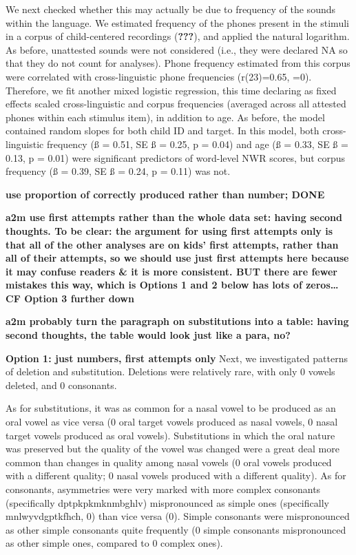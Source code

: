 \documentclass[english,,man,floatsintext]{apa6}
\begin{document}
We next checked whether this may actually be due to frequency of the sounds within the language. We estimated frequency of the phones present in the stimuli in a corpus of child-centered recordings ({\textbf{???}}), and applied the natural logarithm. As before, unattested sounds were not considered (i.e., they were declared NA so that they do not count for analyses). Phone frequency estimated from this corpus were correlated with cross-linguistic phone frequencies (r(23)=0.65, =0). Therefore, we fit another mixed logistic regression, this time declaring as fixed effects scaled cross-linguistic and corpus frequencies (averaged across all attested phones within each stimulus item), in addition to age. As before, the model contained random slopes for both child ID and target. In this model, both cross-linguistic frequency (ß = 0.51, SE ß = 0.25, p = 0.04) and age (ß = 0.33, SE ß = 0.13, p = 0.01) were significant predictors of word-level NWR scores, but corpus frequency (ß = 0.39, SE ß = 0.24, p = 0.11) was not.

\textbf{use proportion of correctly produced rather than number; DONE}

\textbf{a2m use first attempts rather than the whole data set: having second thoughts. To be clear: the argument for using first attempts only is that all of the other analyses are on kids' first attempts, rather than all of their attempts, so we should use just first attempts here because it may confuse readers \& it is more consistent. BUT there are fewer mistakes this way, which is Options 1 and 2 below has lots of zeros\ldots{} CF Option 3 further down}

\textbf{a2m probably turn the paragraph on substitutions into a table: having second thoughts, the table would look just like a para, no?}

\textbf{Option 1: just numbers, first attempts only }
Next, we investigated patterns of deletion and substitution. Deletions were relatively rare, with only 0 vowels deleted, and 0 consonants.

As for substitutions, it was as common for a nasal vowel to be produced as an oral vowel as vice versa (0 oral target vowels produced as nasal vowels, 0 nasal target vowels produced as oral vowels). Substitutions in which the oral nature was preserved but the quality of the vowel was changed were a great deal more common than changes in quality among nasal vowels (0 oral vowels produced with a different quality; 0 nasal vowels produced with a different quality). As for consonants, asymmetries were very marked with more complex consonants (specifically dptpkpkmknmbghlv) mispronounced as simple ones (specifically mnlwyvdgptkfhch, 0) than vice versa (0). Simple consonants were mispronounced as other simple consonants quite frequently (0 simple consonants mispronounced as other simple ones, compared to 0 complex ones).
\end{document}
